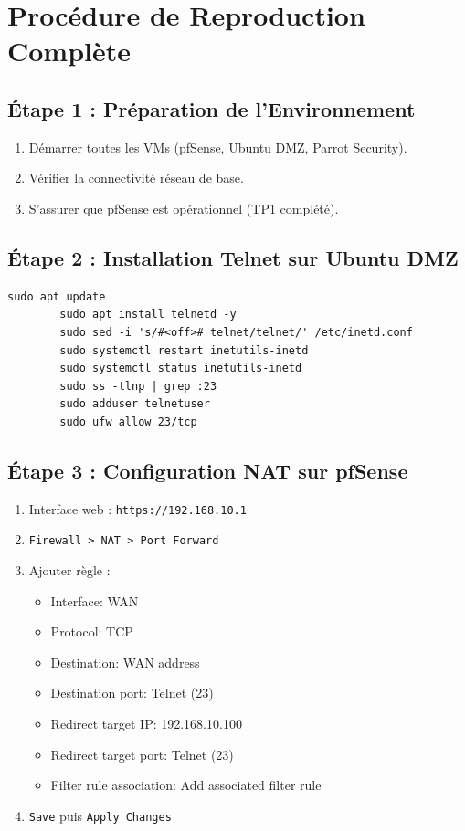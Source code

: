 \documentclass[12pt,a4paper,openany]{report}
\begin{document}
	\section{Procédure de Reproduction Complète}
	
	\subsection{Étape 1 : Préparation de l'Environnement}
	\begin{enumerate}
		\item Démarrer toutes les VMs (pfSense, Ubuntu DMZ, Parrot Security).
		\item Vérifier la connectivité réseau de base.
		\item S'assurer que pfSense est opérationnel (TP1 complété).
	\end{enumerate}
	
	\subsection{Étape 2 : Installation Telnet sur Ubuntu DMZ}
	\begin{lstlisting}[caption=Commandes d'installation]
		sudo apt update
		sudo apt install telnetd -y
		sudo sed -i 's/#<off># telnet/telnet/' /etc/inetd.conf
		sudo systemctl restart inetutils-inetd
		sudo systemctl status inetutils-inetd
		sudo ss -tlnp | grep :23
		sudo adduser telnetuser
		sudo ufw allow 23/tcp
	\end{lstlisting}
	
	\subsection{Étape 3 : Configuration NAT sur pfSense}
	\begin{enumerate}
		\item Interface web : \texttt{https://192.168.10.1}
		\item \texttt{Firewall > NAT > Port Forward}
		\item Ajouter règle :
		\begin{itemize}
			\item Interface: WAN
			\item Protocol: TCP
			\item Destination: WAN address
			\item Destination port: Telnet (23)
			\item Redirect target IP: 192.168.10.100
			\item Redirect target port: Telnet (23)
			\item Filter rule association: Add associated filter rule
		\end{itemize}
		\item \texttt{Save} puis \texttt{Apply Changes}
	\end{enumerate}
	
\end{document}
